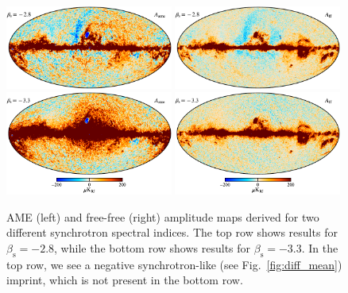\documentclass{aa}
\begin{document}
\begin{figure}
  \center       
  \includegraphics[width=0.49\textwidth]{figs/ame_amp_sbeta280_w12_60arcmin_c-planck.pdf}
  \includegraphics[width=0.49\textwidth]{figs/ff_amp_sbeta280_w12_30arcmin_c-planck.pdf}\\
  \includegraphics[width=0.49\textwidth]{figs/ame_amp_sbeta330_w12_60arcmin_cb_c-planck.pdf}
  \includegraphics[width=0.49\textwidth]{figs/ff_amp_sbeta330_w12_30arcmin_cb_c-planck.pdf}
  \caption{AME (left) and free-free (right) amplitude
    maps derived for two different synchrotron spectral indices. The
    top row shows results for $\beta_{\mathrm{s}}=-2.8$, while
    the bottom row shows results for $\beta_{\mathrm{s}}=-3.3$.
    In the top row, we see a negative synchrotron-like
    (see Fig.~\ref{fig:diff_mean}) imprint, which is not present in
    the bottom row.
  }
  \label{fig:AME_vs_synch_beta}
\end{figure}
\end{document}
